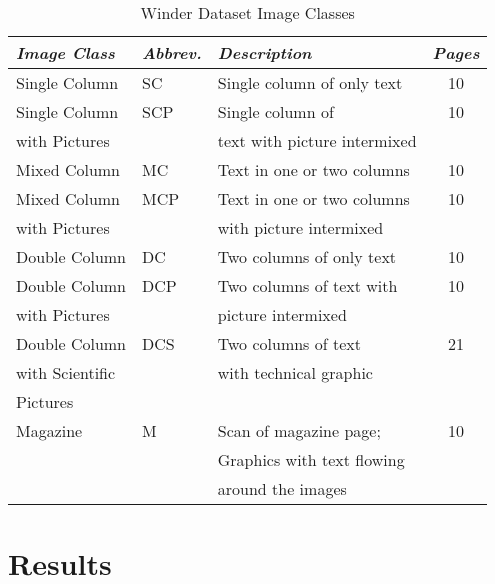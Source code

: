\documentclass[conference]{IEEEtran}
\begin{document}
\begin{table}
\caption{Winder Dataset Image Classes}
\label{table:Winder Image Classes}
\begin{tabular}{|l|l|l|c|}
\hline
\textit{\textbf{Image Class}} & \textit{\textbf{Abbrev.}} & \textit{\textbf{Description}} & \textit{\textbf{Pages}}  \\ 
\hline
\hline
    Single Column & SC & Single column of only text &  10  \\ 
    \hline
    Single Column & SCP & Single column of & 10 \\
    with Pictures &     & text with picture intermixed &    \\ 
    \hline

    Mixed Column & MC & Text in one or two columns & 10 \\
    \hline

    Mixed Column & MCP & Text in one or two columns & 10 \\
    with Pictures&    & with picture intermixed & \\

    \hline
    Double Column & DC & Two columns of only text & 10 \\  
    \hline
    Double Column & DCP & Two columns of text with & 10 \\ 
    with Pictures &     & picture intermixed &    \\  
    \hline
    Double Column  & DCS & Two columns of text & 21 \\
    with Scientific &     &  with technical graphic  & \\ 
    Pictures &  & & \\ 
    \hline
    Magazine & M & Scan of magazine page; & 10 \\
             &   & Graphics with text flowing & \\
             &   & around the images & \\
\hline
\end{tabular}
\end{table}


\section{Results}
\end{document}
